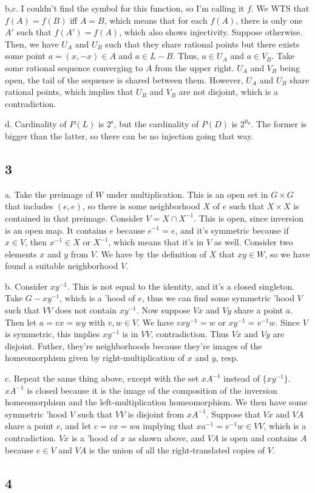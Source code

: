\documentclass{article}
\begin{document}
b,c. I couldn't find the symbol for this function, so I'm calling it $f$. We WTS that $f(A)=f(B)$ iff $A=B$, which means that for each $f(A)$, there is only one $A'$ such that $f(A')=f(A)$, which also shows injectivity. Suppose otherwise. Then, we have $U_A$ and $U_B$ such that they share rational points but there exists some point $a=(x,-x)\in A$ and $a\in L-B$. Thus, $a\in U_A$ and $a\in V_B$. Take some rational sequence converging to $A$ from the upper right. $U_A$ and $V_B$ being open, the tail of the sequence is shared between them. However, $U_A$ and $U_B$ share rational points, which implies that $U_B$ and $V_B$ are not disjoint, which is a contradiction. 

d. Cardinality of $P(L)$ is $2^\mathfrak{c}$, but the cardinality of $P(D)$ is $2^{\aleph_0}$. The former is bigger than the latter, so there can be no injection going that way.

\subsection*{3}
a. Take the preimage of $W$ under multiplication. This is an open set in $G\times G$ that includes $(e,e)$, so there is some neighborhood $X$ of $e$ such that $X\times X$ is contained in that preimage. Consider $V=X\cap X^{-1}$. This is open, since inversion is an open map. It contains $e$ because $e^{-1}=e$, and it's symmetric because if $x\in V$, then $x^{-1}\in X$ or $X^{-1}$, which means that it's in $V$ as well. Consider two elements $x$ and $y$ from $V$. We have by the definition of $X$ that $xy\in W$, so we have found a suitable neighborhood $V$.

b. Consider $xy^{-1}$. This is not equal to the identity, and it's a closed singleton. Take $G-xy^{-1}$, which is a 'hood of $e$, thus we can find some symmetric 'hood $V$ such that $VV$ does not contain $xy^{-1}$. Now suppose $Vx$ and $Vy$ share a point $a$. Then let $a=vx=wy$ with $v,w\in V$. We have $vxy^{-1}=w$ or $xy^{-1}=v^{-1}w$. Since $V$ is symmetric, this implies $xy^{-1}$ is in $VV$, contradiction. Thus $Vx$ and $Vy$ are disjoint. Futher, they're neighborhoods because they're images of the homeomorphism given by right-multiplication of $x$ and $y$, resp.

c. Repeat the same thing above, except with the set $xA^{-1}$ instead of $\{xy^{-1}\}$. $xA^{-1}$ is closed because it is the image of the composition of the inversion homeomorphism and the left-multiplication homeomorphism. We then have some symmetric 'hood $V$ such that $VV$ is disjoint from $xA^{-1}$. Suppose that $Vx$ and $VA$ share a point $c$, and let $c=vx=wa$ implying that $xa^{-1}=v^{-1}w\in VV$, which is a contradiction. $Vx$ is a 'hood of $x$ as shown above, and $VA$ is open and contains $A$ because $e\in V$ and $VA$ is the union of all the right-translated copies of $V$.

\subsection*{4}
\end{document}
